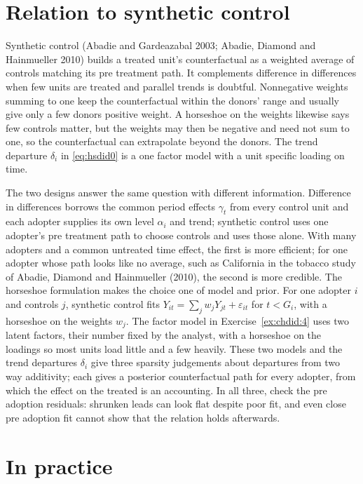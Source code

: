 \section{Relation to synthetic control}

Synthetic control (Abadie and Gardeazabal 2003; Abadie, Diamond and Hainmueller 2010) builds a treated unit's counterfactual as a weighted average of controls matching its pre treatment path. It complements difference in differences when few units are treated and parallel trends is doubtful. Nonnegative weights summing to one keep the counterfactual within the donors' range and usually give only a few donors positive weight. A horseshoe on the weights likewise says few controls matter, but the weights may then be negative and need not sum to one, so the counterfactual can extrapolate beyond the donors. The trend departure $\delta_i$ in \eqref{eq:hsdid0} is a one factor model with a unit specific loading on time.

The two designs answer the same question with different information. Difference in differences borrows the common period effects $\gamma_t$ from every control unit and each adopter supplies its own level $\alpha_i$ and trend; synthetic control uses one adopter's pre treatment path to choose controls and uses those alone. With many adopters and a common untreated time effect, the first is more efficient; for one adopter whose path looks like no average, such as California in the tobacco study of Abadie, Diamond and Hainmueller (2010), the second is more credible. The horseshoe formulation makes the choice one of model and prior. For one adopter $i$ and controls $j$, synthetic control fits $Y_{it} = \sum_j w_j Y_{jt} + \varepsilon_{it}$ for $t < G_i$, with a horseshoe on the weights $w_j$. The factor model in Exercise~\ref{ex:chdid:4} uses two latent factors, their number fixed by the analyst, with a horseshoe on the loadings so most units load little and a few heavily. These two models and the trend departures $\delta_i$ give three sparsity judgements about departures from two way additivity; each gives a posterior counterfactual path for every adopter, from which the effect on the treated is an accounting. In all three, check the pre adoption residuals: shrunken leads can look flat despite poor fit, and even close pre adoption fit cannot show that the relation holds afterwards.

\section{In practice}


